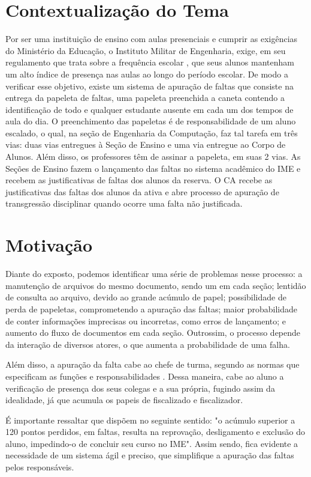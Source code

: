 \section{Contextualização do Tema}
Por ser uma instituição de ensino com aulas presenciais e cumprir as exigências do Ministério da Educação, o Instituto Militar de Engenharia, exige, em seu regulamento que trata sobre a frequência escolar \citep{NICFA}, que seus alunos mantenham um alto índice de presença nas aulas ao longo do período escolar. De modo a verificar esse objetivo, existe um sistema de apuração de faltas que consiste na entrega da papeleta de faltas, uma papeleta preenchida a caneta contendo a identificação de todo e qualquer estudante ausente em cada um dos tempos de aula do dia. O preenchimento das papeletas é de responsabilidade de um aluno escalado,  o qual, na seção de Engenharia da Computação, faz tal tarefa em três vias: duas vias entregues à Seção de Ensino e uma via entregue ao Corpo de Alunos. Além disso, os professores têm de assinar a papeleta, em suas 2 vias. As Seções de Ensino fazem o lançamento das faltas no sistema acadêmico do IME e recebem as justificativas de faltas dos alunos da reserva. O CA recebe as justificativas das faltas dos alunos da ativa e abre processo de apuração de transgressão disciplinar quando ocorre uma falta não justificada.  

\section{Motivação}
Diante do exposto, podemos identificar uma série de problemas nesse processo: a manutenção de arquivos do mesmo documento,  sendo um em cada seção; lentidão de consulta ao arquivo, devido ao grande acúmulo de papel; possibilidade de perda de papeletas, comprometendo a apuração das faltas; maior probabilidade de conter informações imprecisas ou incorretas, como erros de lançamento; e aumento do fluxo de documentos em cada seção. Outrossim, o processo depende da interação de diversos atores, o que aumenta a probabilidade de uma falha.

Além disso, a apuração da falta cabe ao chefe de turma, segundo as normas que especificam as funções e responsabilidades \citep{NEFSE}. Dessa maneira, cabe ao aluno a verificação de presença dos seus colegas e a sua própria, fugindo assim da idealidade,  já que acumula os papeis de fiscalizado e fiscalizador.

É importante ressaltar que \citep{NICFA} dispõem no seguinte sentido: "o acúmulo superior a 120 pontos perdidos, em faltas, resulta na reprovação, desligamento e exclusão do aluno, impedindo-o de concluir seu curso no IME". Assim sendo, fica evidente a necessidade de um sistema ágil e preciso, que simplifique a apuração das faltas pelos responsáveis.

